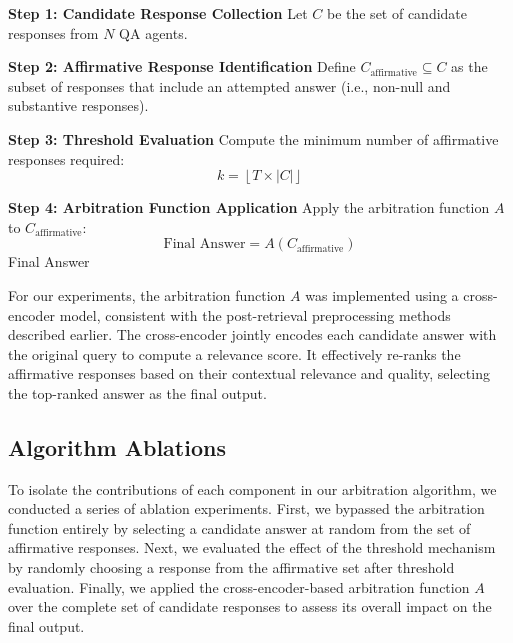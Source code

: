 \documentclass[sigconf,nonacm]{acmart}
\begin{document}
\begin{algorithm}[ht]
\DontPrintSemicolon
{}


\BlankLine
\textbf{Step 1: Candidate Response Collection}\;
Let $C$ be the set of candidate responses from $N$ QA agents.\;

\BlankLine
\textbf{Step 2: Affirmative Response Identification}\;
Define $C_{\text{affirmative}} \subseteq C$ as the subset of responses that include an attempted answer (i.e., non-null and substantive responses).\;

\BlankLine
\textbf{Step 3: Threshold Evaluation}\;
Compute the minimum number of affirmative responses required:\;
\[
k = \left\lfloor T \times |C| \right\rfloor
\]\;

\BlankLine
\textbf{Step 4: Arbitration Function Application}\;
Apply the arbitration function $A$ to $C_{\text{affirmative}}$:\;
\[
\text{Final Answer} = A(C_{\text{affirmative}})
\]\;
\Return Final Answer\;

\caption{Candidate Response Collection and Arbitration}
\label{alg:arbitration}
\end{algorithm}


For our experiments, the arbitration function $A$ was implemented using a cross-encoder model, consistent with the post-retrieval preprocessing methods described earlier. The cross-encoder jointly encodes each candidate answer with the original query to compute a relevance score. It effectively re-ranks the affirmative responses based on their contextual relevance and quality, selecting the top-ranked answer as the final output.




\subsection{Algorithm Ablations}

To isolate the contributions of each component in our arbitration algorithm, we conducted a series of ablation experiments. First, we bypassed the arbitration function entirely by selecting a candidate answer at random from the set of affirmative responses. Next, we evaluated the effect of the threshold mechanism by randomly choosing a response from the affirmative set after threshold evaluation. Finally, we applied the cross-encoder-based arbitration function \(A\) over the complete set of candidate responses to assess its overall impact on the final output.
\end{document}
